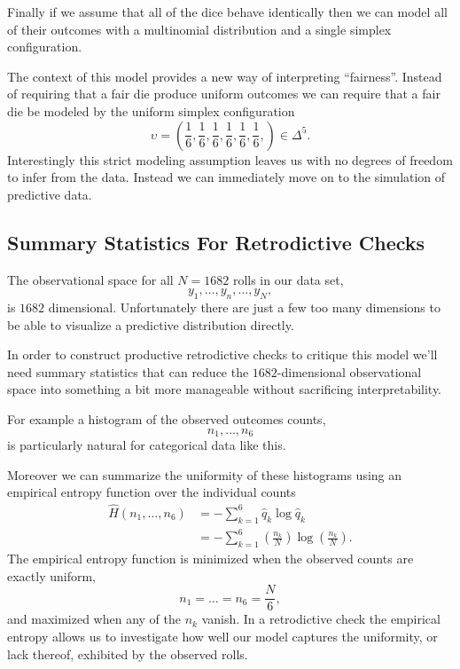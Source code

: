 \documentclass[
  letterpaper,
  DIV=11,
  numbers=noendperiod]{scrartcl}
\begin{document}
Finally if we assume that all of the dice behave identically then we can
model all of their outcomes with a multinomial distribution and a single
simplex configuration.

The context of this model provides a new way of interpreting
``fairness''. Instead of requiring that a fair die produce uniform
outcomes we can require that a fair die be modeled by the uniform
simplex configuration \[
\upsilon
=
\left( \frac{1}{6}, \frac{1}{6}, \frac{1}{6},
       \frac{1}{6}, \frac{1}{6}, \frac{1}{6}, \right) \in \Delta^{5}.
\] Interestingly this strict modeling assumption leaves us with no
degrees of freedom to infer from the data. Instead we can immediately
move on to the simulation of predictive data.

\subsection{Summary Statistics For Retrodictive
Checks}\label{summary-statistics-for-retrodictive-checks}

The observational space for all \(N = 1682\) rolls in our data set, \[
y_{1}, \ldots, y_{n}, \ldots, y_{N},
\] is \(1682\) dimensional. Unfortunately there are just a few too many
dimensions to be able to visualize a predictive distribution directly.

In order to construct productive retrodictive checks to critique this
model we'll need summary statistics that can reduce the
\(1682\)-dimensional observational space into something a bit more
manageable without sacrificing interpretability.

For example a histogram of the observed outcomes counts, \[
n_{1}, \ldots, n_{6}
\] is particularly natural for categorical data like this.

Moreover we can summarize the uniformity of these histograms using an
empirical entropy function over the individual counts \begin{align*}
\hat{H}(n_{1}, \ldots, n_{6})
&=
- \sum_{k = 1}^{6} \hat{q}_{k} \log \hat{q}_{k}
\\
&=
- \sum_{k = 1}^{6}
\left( \frac{n_{k}}{N} \right) \log \left( \frac{n_{k}}{N} \right).
\end{align*} The empirical entropy function is minimized when the
observed counts are exactly uniform, \[
n_{1} = \ldots = n_{6} = \frac{N}{6},
\] and maximized when any of the \(n_{k}\) vanish. In a retrodictive
check the empirical entropy allows us to investigate how well our model
captures the uniformity, or lack thereof, exhibited by the observed
rolls.
\end{document}
